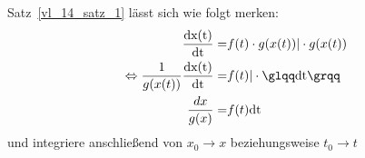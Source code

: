 \begin{Bemerkung}{
	Satz~\ref{vl_14_satz_1} lässt sich wie folgt merken:
	\begin{align*}
		\frac{\mathrm{dx(t)}}{\mathrm{dt}} = & f(t) \cdot g(x(t))
			\vert \cdot g(x(t)) \\
		\Leftrightarrow 
		\frac{1}{g(x(t))} \frac{\mathrm{dx(t)}}{\mathrm{dt}} = & f(t)  \vert 
			\cdot \text{\glqq} \mathrm{dt}\text{\grqq} \\	
		\frac{dx}{g(x)} = &  f(t) \mathrm{dt}
	\end{align*}
	und integriere anschließend von $x_0 \rightarrow x$ beziehungsweise $t_0 
	\rightarrow t$
}\end{Bemerkung}